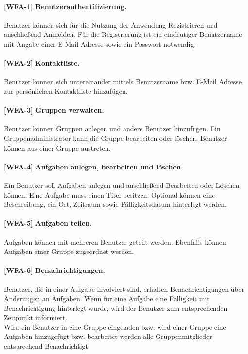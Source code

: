 \paragraph{[WFA-1] Benutzerauthentifizierung.} Benutzer können sich für die Nutzung der Anwendung Registrieren und anschließend Anmelden. Für die Registrierung ist ein eindeutiger Benutzername mit Angabe einer E-Mail Adresse sowie ein Passwort notwendig.

\paragraph{[WFA-2] Kontaktliste.} Benutzer können sich untereinander mittels Benutzername bzw. E-Mail Adresse zur persönlichen Kontaktliste hinzufügen.

\paragraph{[WFA-3] Gruppen verwalten. } Benutzer können Gruppen anlegen und andere Benutzer hinzufügen. Ein Gruppenadministrator kann die Gruppe bearbeiten oder löschen. Benutzer können aus einer Gruppe austreten.

\paragraph{[WFA-4] Aufgaben anlegen, bearbeiten und löschen.} Ein Benutzer soll Aufgaben anlegen und anschließend Bearbeiten oder Löschen können.
Eine Aufgabe muss einen Titel besitzen. Optional können eine Beschreibung, ein Ort, Zeitraum sowie Fälligkeitsdatum hinterlegt werden.

\paragraph{[WFA-5] Aufgaben teilen.} Aufgaben können mit mehreren Benutzer geteilt werden. Ebenfalls können Aufgaben einer Gruppe zugeordnet werden. 

\paragraph{[WFA-6] Benachrichtigungen.} Benutzer, die in einer Aufgabe involviert sind, erhalten Benachrichtigungen über Änderungen an Aufgaben. Wenn für eine Aufgabe eine Fälligkeit mit Benachrichtigung hinterlegt wurde, wird der Benutzer zum entsprechenden Zeitpunkt informiert.\\
Wird ein Benutzer in eine Gruppe eingeladen bzw. wird einer Gruppe eine Aufgaben hinzugefügt bzw. bearbeitet werden alle Gruppenmitglieder entsprechend Benachrichtigt.

